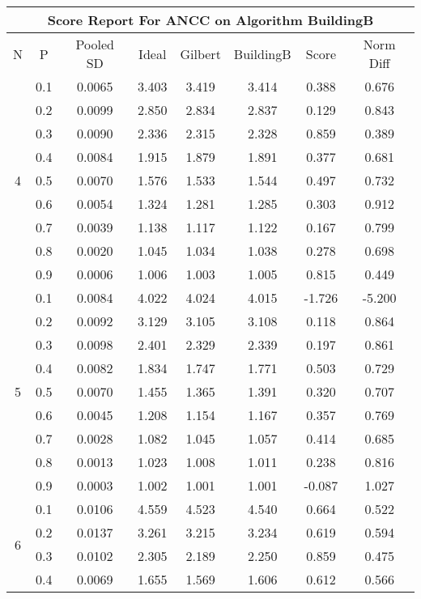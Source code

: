 \documentclass[11pt,a4paper]{report}
\begin{document}
\begin{longtable}{ | c | c || c | c | c | c | c | c | }
\hline
\multicolumn{8}{|c|}{ Score Report For ANCC on Algorithm BuildingB} \\
\hline
N & P & Pooled SD &  Ideal &  Gilbert & BuildingB  & Score & Norm Diff \\
 \hline
 \hline
 \endhead
\multirow{9}{*}{4} & 0.1 & 0.0065 & 3.403 & 3.419 & 3.414 & 0.388 & 0.676 \\
 & 0.2 & 0.0099 & 2.850 & 2.834 & 2.837 & 0.129 & 0.843 \\
 & 0.3 & 0.0090 & 2.336 & 2.315 & 2.328 & 0.859 & 0.389 \\
 & 0.4 & 0.0084 & 1.915 & 1.879 & 1.891 & 0.377 & 0.681 \\
 & 0.5 & 0.0070 & 1.576 & 1.533 & 1.544 & 0.497 & 0.732 \\
 & 0.6 & 0.0054 & 1.324 & 1.281 & 1.285 & 0.303 & 0.912 \\
 & 0.7 & 0.0039 & 1.138 & 1.117 & 1.122 & 0.167 & 0.799 \\
 & 0.8 & 0.0020 & 1.045 & 1.034 & 1.038 & 0.278 & 0.698 \\
 & 0.9 & 0.0006 & 1.006 & 1.003 & 1.005 & 0.815 & 0.449 \\
 \hline
\multirow{9}{*}{5} & 0.1 & 0.0084 & 4.022 & 4.024 & 4.015 & -1.726 & -5.200 \\
 & 0.2 & 0.0092 & 3.129 & 3.105 & 3.108 & 0.118 & 0.864 \\
 & 0.3 & 0.0098 & 2.401 & 2.329 & 2.339 & 0.197 & 0.861 \\
 & 0.4 & 0.0082 & 1.834 & 1.747 & 1.771 & 0.503 & 0.729 \\
 & 0.5 & 0.0070 & 1.455 & 1.365 & 1.391 & 0.320 & 0.707 \\
 & 0.6 & 0.0045 & 1.208 & 1.154 & 1.167 & 0.357 & 0.769 \\
 & 0.7 & 0.0028 & 1.082 & 1.045 & 1.057 & 0.414 & 0.685 \\
 & 0.8 & 0.0013 & 1.023 & 1.008 & 1.011 & 0.238 & 0.816 \\
 & 0.9 & 0.0003 & 1.002 & 1.001 & 1.001 & -0.087 & 1.027 \\
 \hline
\multirow{9}{*}{6} & 0.1 & 0.0106 & 4.559 & 4.523 & 4.540 & 0.664 & 0.522 \\
 & 0.2 & 0.0137 & 3.261 & 3.215 & 3.234 & 0.619 & 0.594 \\
 & 0.3 & 0.0102 & 2.305 & 2.189 & 2.250 & 0.859 & 0.475 \\
 & 0.4 & 0.0069 & 1.655 & 1.569 & 1.606 & 0.612 & 0.566 \\

\end{longtable}
\end{document}
